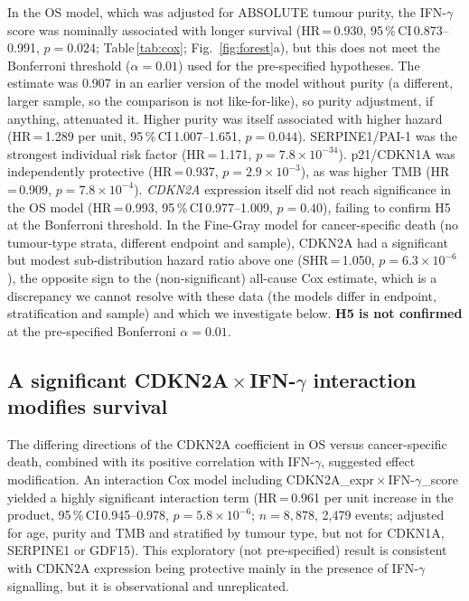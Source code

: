 \documentclass[10pt,twocolumn]{article}
\begin{document}
In the OS model, which was adjusted for ABSOLUTE tumour purity, the
IFN-$\gamma$ score was nominally associated with longer survival
(HR\,=\,0.930, 95\,\%\,CI\,0.873--0.991, $p=0.024$;
Table\,\ref{tab:cox}; Fig.~\ref{fig:forest}a), but this does not meet the
Bonferroni threshold ($\alpha=0.01$) used for the pre-specified
hypotheses. The estimate was 0.907 in an earlier version of the model
without purity (a different, larger sample, so the comparison is not
like-for-like), so purity adjustment, if anything, attenuated it. Higher
purity was itself associated with higher hazard
(HR\,=\,1.289 per unit, 95\,\%\,CI\,1.007--1.651, $p=0.044$).
SERPINE1/PAI-1 was the
strongest individual risk factor (HR\,=\,1.171, $p=7.8\times10^{-34}$).
p21/CDKN1A was independently protective (HR\,=\,0.937, $p=2.9\times10^{-3}$),
as was higher TMB (HR\,=\,0.909, $p=7.8\times10^{-4}$). \textit{CDKN2A} expression
itself did not reach significance in the OS model (HR\,=\,0.993,
95\,\%\,CI\,0.977--1.009, $p=0.40$), failing to confirm H5 at the Bonferroni
threshold. In the Fine-Gray model for cancer-specific death (no tumour-type
strata, different endpoint and sample), CDKN2A had a significant but modest
sub-distribution hazard ratio above one (SHR\,=\,1.050, $p=6.3\times10^{-6}$),
the opposite sign to the (non-significant) all-cause Cox estimate, which
is a discrepancy we cannot resolve with these data (the models differ in
endpoint, stratification and sample) and which we investigate below.
\textbf{H5 is not confirmed} at the pre-specified Bonferroni
$\alpha=0.01$.

\subsection{A significant CDKN2A\,$\times$\,IFN-$\gamma$ interaction
modifies survival}

The differing directions of the CDKN2A coefficient in OS versus
cancer-specific death, combined with its positive correlation with
IFN-$\gamma$, suggested effect modification. An interaction Cox model
including CDKN2A\_expr\,$\times$\,IFN-$\gamma$\_score yielded a highly
significant interaction term (HR\,=\,0.961 per unit increase in the
product, 95\,\%\,CI\,0.945--0.978, $p=5.8\times10^{-6}$;
$n=8{,}878$, 2,479 events; adjusted for age, purity and TMB and
stratified by tumour type, but not for CDKN1A, SERPINE1 or GDF15). This
exploratory (not pre-specified) result is
consistent with CDKN2A expression being protective mainly in the
presence of IFN-$\gamma$ signalling, but it is observational and
unreplicated.
\end{document}

